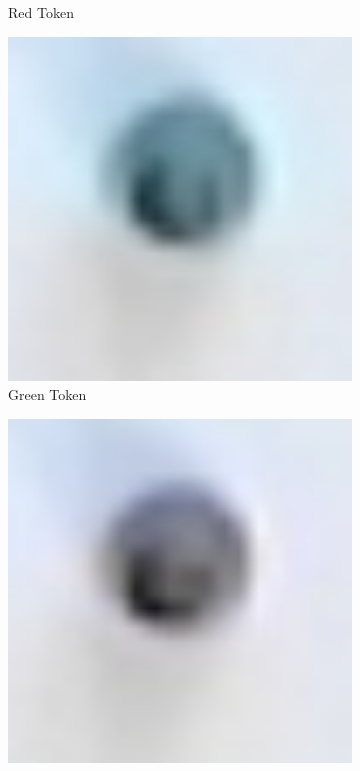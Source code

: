 \documentclass[12pt]{article}
\begin{document}
\begin{figure}[H]
\begin{subfigure}{0.2\textwidth}
        \caption{Red Token}
        \label{fig:tokencolore}
    \end{subfigure}
    \begin{subfigure}{0.2\textwidth}
        \includegraphics[width=1\textwidth]{images/figures/fig10f}
        \caption{Green Token}
        \label{fig:tokencolorf}
    \end{subfigure}
    \begin{subfigure}{0.2\textwidth}
        \includegraphics[width=1\textwidth]{images/figures/fig10g}

\end{subfigure}
\end{figure}
\end{document}
